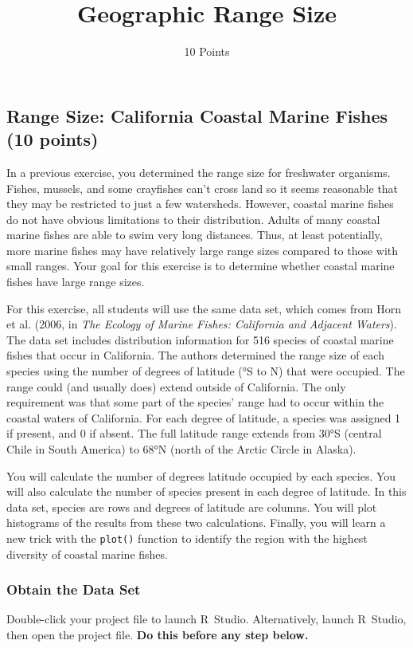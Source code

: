 \documentclass[11pt]{article}
\title{Geographic Range Size}
\author{10 Points}
\date{}                                           %
\begin{document}
	\thispagestyle{first_page}

\subsection*{Range Size: California Coastal Marine Fishes (10 points)}

In a previous exercise, you determined the range size for freshwater
organisms. Fishes, mussels, and some crayfishes can't cross land so it seems
reasonable that they may be restricted to just a few watersheds.
However, coastal marine fishes do not have obvious limitations to their
distribution. Adults of many coastal marine fishes are able to swim very
long distances. Thus, at least potentially, more marine fishes may have
relatively large range sizes compared to those with small ranges. Your
goal for this exercise is to determine whether coastal marine fishes
have large range sizes.

For this exercise, all students will use the same data set, which comes
from Horn et al. (2006, in \emph{The Ecology of Marine Fishes:
California and Adjacent Waters}). The data set includes distribution
information for 516 species of coastal marine fishes that occur in
California. The authors determined the range size of each species using
the number of degrees of latitude (°S to N) that were occupied. The
range could (and usually does) extend outside of California. The only
requirement was that some part of the species' range had to occur within
the coastal waters of California. For each degree of latitude, a species
was assigned 1 if present, and 0 if absent. The full latitude range
extends from 30°S (central Chile in South America) to 68°N (north of the
Arctic Circle in Alaska).

You will calculate the number of degrees latitude occupied by each
species. You will also calculate the number of species present in each
degree of latitude. In this data set, species are rows and degrees of
latitude are columns. You will plot histograms of the results from these
two calculations. Finally, you will learn a new trick with the
\texttt{plot()} function to identify the region with the highest
diversity of coastal marine fishes.

\subsubsection*{Obtain the Data Set}

Double-click your project file to launch R~Studio. Alternatively, launch 
R~Studio, then open the project file. \textbf{Do this before any step 
	below.}
\end{document}
